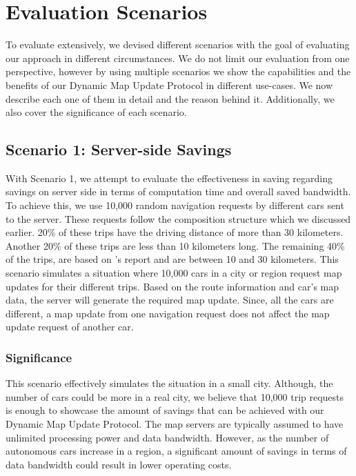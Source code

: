 \section{Evaluation Scenarios}
To evaluate extensively, we devised different scenarios with the goal of evaluating our approach in different circumstances. We do not limit our evaluation from one perspective, however by using multiple scenarios we show the capabilities and the benefits of our Dynamic Map Update Protocol in different use-cases. We now describe each one of them in detail and the reason behind it. Additionally, we also cover the significance of each scenario.
\subsection{Scenario 1: Server-side Savings} \label{evlscenario1}
With Scenario 1, we attempt to evaluate the effectiveness in saving regarding savings on server side in terms of computation time and overall saved bandwidth. To achieve this, we use 10,000 random navigation requests by different cars sent to the server. These requests follow the composition structure which we discussed earlier. 20\% of these trips have the driving distance of more than 30 kilometers. Another 20\% of these trips are less than 10 kilometers long. The remaining 40\% of the trips, are based on \citet{pasaoglu2012driving}'s report and are between 10 and 30 kilometers. This scenario simulates a situation where 10,000 cars in a city or region request map updates for their different trips. Based on the route information and car's map data, the server will generate the required map update. Since, all the cars are different, a map update from one navigation request does not affect the map update request of another car.  
\subsubsection{Significance}
This scenario effectively simulates the situation in a small city. Although, the number of cars could be more in a real city, we believe that 10,000 trip requests is enough to showcase the amount of savings that can be achieved with our Dynamic Map Update Protocol. The map servers are typically assumed to have unlimited processing power and data bandwidth. However, as the number of autonomous cars increase in a region, a significant amount of savings in terms of data bandwidth could result in lower operating costs.  

